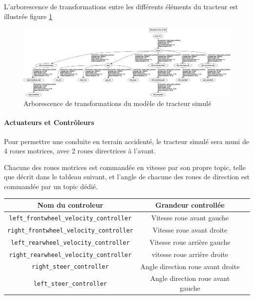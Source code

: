 \documentclass[12pt,a4paper]{report}
\begin{document}
			\para L'arborescence de transformations entre les différents éléments du tracteur est illustrée figure \ref{fig:frames}
			
			\begin{figure}
				\centering
				\includegraphics[width=1\linewidth]{img/frames}
				\caption[tracteurframes]{Arborescence de transformations du modèle de tracteur simulé}
				\label{fig:frames}
			\end{figure}
			
			
			
			\paragraph{Actuateurs et Contrôleurs}
			
			Pour permettre une conduite en terrain accidenté, le tracteur simulé sera muni de 4 roues motrices, avec 2 roues directrices à l'avant.
			
			\para Chacune des roues motrices est commandée en vitesse par son propre topic, telle que décrit dans le tableau suivant, et l'angle de chacune des roues de direction est commandée par un topic dédié.
			
			\begin{center}
				\begin{tabular}{|c|c|c|}
					\hline 
					\textbf{Nom du controleur} & \textbf{Grandeur controllée} \\ 
					\hline 
					\verb|left_frontwheel_velocity_controller| & Vitesse roue avant gauche \\ 
					\hline 
					\verb|right_frontwheel_velocity_controller| & Vitesse roue avant droite \\ 
					\hline 
					\verb|left_rearwheel_velocity_controller| & Vitesse roue arrière gauche \\ 
					\hline 
					\verb|right_rearwheel_velocity_controller| & vitesse roue arrière droite \\ 
					\hline 
					\verb|right_steer_controller| & Angle direction roue avant droite \\ 
					\hline 
					\verb|left_steer_controller| & Angle direction roue avant gauche \\ 
					\hline 
				\end{tabular} 
			\end{center}
\end{document}
